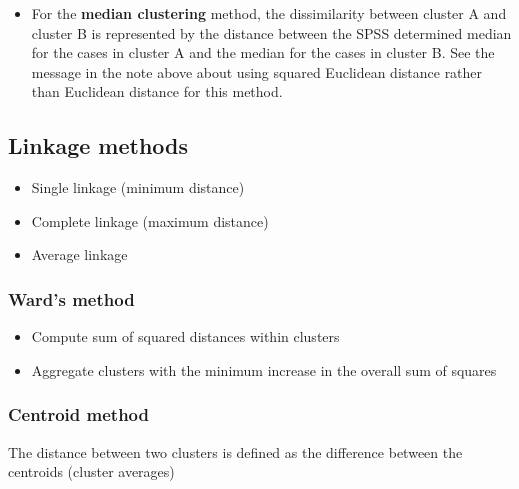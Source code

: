 \documentclass[a4paper,12pt]{article}
\begin{document}
\begin{itemize}
	\item 
	For the \textbf{median clustering} method, the dissimilarity between cluster A and cluster B is represented by the distance between the SPSS determined median for the cases in cluster A and the median for the cases in cluster B.  See the message in the note above about using squared Euclidean distance rather than Euclidean distance for this method.
	
\end{itemize}
	
	
	
	
%


\subsection{Linkage methods}
\begin{itemize}
	\item  Single linkage (minimum distance)
	\item  Complete linkage (maximum distance)
	\item  Average linkage
\end{itemize}


\subsubsection{Ward's method}
\begin{itemize}
	\item  Compute sum of squared distances within clusters
	\item  Aggregate clusters with the minimum increase in the
	overall sum of squares
\end{itemize}
\subsubsection{Centroid method}
The distance between two clusters is defined as the
difference between the centroids (cluster averages)
\end{document}
